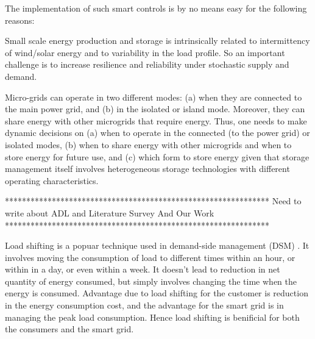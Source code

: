 The implementation of such smart controls is by no means easy for the following reasons:
\begin{inparaenum}[\bfseries (i)]
\item Small scale energy production and storage is intrinsically
         related to intermittency of wind/solar energy and to variability in the load profile.
          So an important challenge is to increase resilience and reliability under stochastic supply and
                 demand.
\item Micro-grids can operate in two different modes: (a) when they are connected to the
main power grid, and (b) in the isolated or island mode. Moreover, they can share energy with
other microgrids that require energy. Thus, one needs to make
dynamic decisions on (a) when to operate in the connected (to the power grid) or isolated modes, 
(b) when to share energy with other microgrids and when to store energy for future use, and (c) 
which form to store energy given that storage management itself
involves heterogeneous storage technologies with different
operating characteristics.
\end{inparaenum}

**************************************************************
Need to write about ADL and Literature Survey And Our Work
**************************************************************

Load shifting is a popuar technique used in demand-side management (DSM) \cite{DTU2010}. It involves moving the consumption of load to different times within an hour, or within in a day, or even within a week. It doesn't lead to reduction in net quantity of energy consumed, but simply involves changing the time when the energy is consumed. Advantage due to load shifting for the customer is reduction in the energy consumption cost, and the advantage for the smart grid is in managing the peak load consumption. Hence load shifting is benificial for both the consumers and the smart grid.


